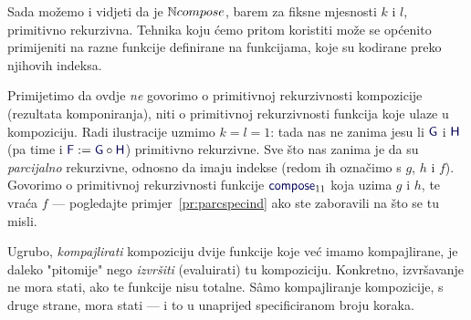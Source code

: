 
Sada možemo i vidjeti da je ${\mathbb N} compose$, barem za fiksne mjesnosti $k$ i $l$, primitivno rekurzivna. Tehnika koju ćemo pritom koristiti može se općenito primijeniti na razne funkcije definirane na funkcijama, koje su kodirane preko njihovih indeksa.

Primijetimo da ovdje \emph{ne} govorimo o primitivnoj rekurzivnosti kompozicije (rezultata komponiranja), niti o primitivnoj rekurzivnosti funkcija koje ulaze u kompoziciju. Radi ilustracije uzmimo $k=l=1$: tada nas ne zanima jesu li $\f G$ i $\f H$ (pa time i $\f F:=\f G\circ\f H$) primitivno rekurzivne. Sve što nas zanima je da su \emph{parcijalno} rekurzivne, odnosno da imaju indekse (redom ih označimo s $g$, $h$ i $f$). Govorimo o primitivnoj rekurzivnosti funkcije $\f{compose}_{11}$ koja uzima $g$ i $h$, te vraća $f$ --- pogledajte primjer~\ref{pr:parcspecind} ako ste zaboravili na što se tu misli.

Ugrubo, \emph{kompajlirati} kompoziciju dvije funkcije koje već imamo kompajlirane, je daleko "pitomije" nego \emph{izvršiti} (evaluirati) tu kompoziciju. Konkretno, izvršavanje ne mora stati, ako te funkcije nisu totalne. Sâmo kompajliranje kompozicije, s druge strane, mora stati --- i to u unaprijed specificiranom broju koraka.

